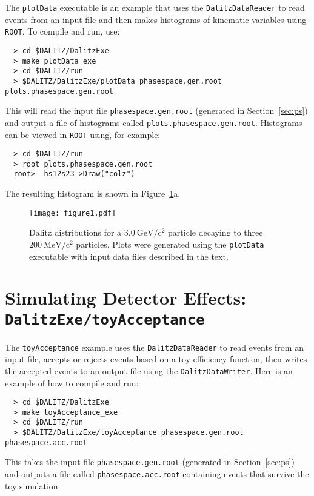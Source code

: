\documentclass[10pt]{article}
\newcommand{\gevcc}{\mathrm{GeV/c^2}}
\newcommand{\mevcc}{\mathrm{MeV/c^2}}
\begin{document}
The {\tt plotData} executable is an example that uses the {\tt DalitzDataReader} to read events from an input file and then makes histograms of kinematic variables using {\tt ROOT}.  To compile and run, use:
\begin{verbatim}
  > cd $DALITZ/DalitzExe
  > make plotData_exe
  > cd $DALITZ/run
  > $DALITZ/DalitzExe/plotData phasespace.gen.root plots.phasespace.gen.root
\end{verbatim}
This will read the input file {\tt phasespace.gen.root} (generated in Section~\ref{sec:ps}) and output a file of histograms called {\tt plots.phasespace.gen.root}.  Histograms can be viewed in {\tt ROOT} using, for example:
\begin{verbatim}
  > cd $DALITZ/run
  > root plots.phasespace.gen.root
  root>  hs12s23->Draw("colz")
\end{verbatim}
The resulting histogram is shown in Figure~\ref{fig:dalitz}a.

\begin{figure}[h!]
\begin{center}
\texttt{[image: figure1.pdf]}
\caption{Dalitz distributions for a $3.0~\gevcc$ particle decaying to three $200~\mevcc$ particles.  Plots were generated using the {\tt plotData} executable with input data files described in the text.
\label{fig:dalitz}}
\end{center}
\end{figure}


\section{Simulating Detector Effects: \\
{\tt DalitzExe/toyAcceptance}}
\label{sec:eff}

The {\tt toyAcceptance} example uses the {\tt DalitzDataReader} to read events from an input file, accepts or rejects events based on a toy efficiency function, then writes the accepted events to an output file using the {\tt DalitzDataWriter}.  Here is an example of how to compile and run:
\begin{verbatim}
  > cd $DALITZ/DalitzExe
  > make toyAcceptance_exe
  > cd $DALITZ/run
  > $DALITZ/DalitzExe/toyAcceptance phasespace.gen.root phasespace.acc.root
\end{verbatim}
This takes the input file {\tt phasespace.gen.root} (generated in Section~\ref{sec:ps}) and outputs a file called {\tt phasespace.acc.root} containing events that survive the toy simulation.
\end{document}
